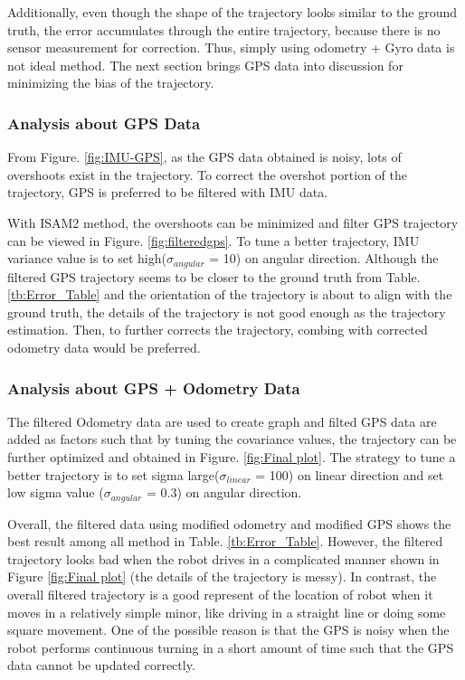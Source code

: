Additionally, even though the shape of the trajectory looks similar to the ground truth, the error accumulates through the entire trajectory, because there is no sensor measurement for correction. Thus, simply using odometry + Gyro data is not ideal method. The next section brings GPS data into discussion for minimizing the bias of the trajectory. 

\subsubsection{Analysis about GPS Data}
From Figure. \ref{fig:IMU-GPS}, as the GPS data obtained is noisy, lots of overshoots exist in the trajectory. To correct the overshot portion of the trajectory, GPS is preferred to be filtered with IMU data. 

With ISAM2 method, the overshoots can be minimized and filter GPS trajectory can be viewed in Figure. \ref{fig:filteredgps}. To tune a better trajectory, IMU variance value is to set high($\sigma_{angular}$ = 10) on angular direction. Although the filtered GPS trajectory seems to be closer to the ground truth from Table. \ref{tb:Error_Table} and the orientation of the trajectory is about to align with the ground truth, the details of the trajectory is not good enough as the trajectory estimation. Then, to further corrects the trajectory, combing with corrected odometry data would be preferred. 

\subsubsection{Analysis about GPS + Odometry Data}
The filtered Odometry data are used to create graph and filted GPS data are added as factors such that by tuning the covariance values, the trajectory can be further optimized and obtained in Figure. \ref{fig:Final plot}. The strategy to tune a better trajectory is to set sigma large($\sigma_{linear}$ = 100) on linear direction and set low sigma value ($\sigma_{angular}$ = 0.3) on angular direction.

Overall, the filtered data using modified odometry and modified GPS shows the best result among all method in Table. \ref{tb:Error_Table}. However, the filtered trajectory looks bad when the robot drives in a complicated manner shown in Figure \ref{fig:Final plot} (the details of the trajectory is messy). In contrast, the overall filtered trajectory is a good represent of the location of robot when it moves in a relatively simple minor, like driving in a straight line or doing some square movement. One of the possible reason is that the GPS is noisy when the robot performs continuous turning in a short amount of time such that the GPS data cannot be updated correctly.

